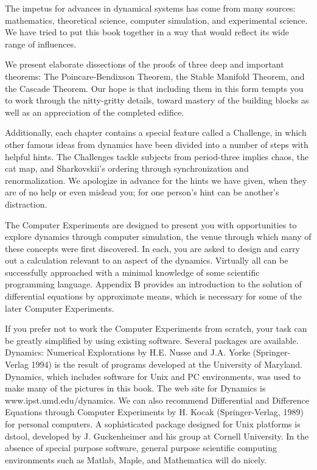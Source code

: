 \documentclass[12pt]{article}
\begin{document}
The impetus for advances in dynamical systems has come from many sources: mathematics, theoretical science, 
computer simulation, and experimental science. We have tried to put this book together in a way that would reflect its wide range of 
influences.

We present elaborate dissections of the proofs of three deep and important theorems: The 
Poincare-Bendixson Theorem, the Stable Manifold Theorem, and the Cascade Theorem. Our hope is that 
including them in this form tempts you to work through the nitty-gritty details, toward mastery of the 
building blocks as well as an appreciation of the completed edifice.

Additionally, each chapter contains a special feature called a Challenge, in which other famous ideas from 
dynamics have been divided into a number of steps with helpful hints. The Challenges tackle subjects from 
period-three implies chaos, the cat map, and Sharkovskii’s ordering through synchronization and 
renormalization. We apologize in advance for the hints we have given, when they are of no help or even 
mislead you; for one person’s hint can be another’s distraction.

The Computer Experiments are designed to present you with opportunities to explore dynamics through 
computer simulation, the venue through which many of these concepts were first discovered. In each, you are 
asked to design and carry out a calculation relevant to an aspect of the dynamics. Virtually all can be 
successfully approached with a minimal knowledge of some scientific programming language. Appendix B 
provides an introduction to the solution of differential equations by approximate means, which is necessary 
for some of the later Computer Experiments.

If you prefer not to work the Computer Experiments from scratch, your task can be greatly simplified by 
using existing software. Several packages are available. Dynamics: Numerical Explorations by H.E. Nusse and 
J.A. Yorke (Springer-Verlag 1994) is the result of programs developed at the University of Maryland. 
Dynamics, which includes software for Unix and PC environments, was used to make many of the pictures in 
this book. The web site for Dynamics is www.ipst.umd.edu/dynamics. We can also recommend Differential and 
Difference Equations through Computer Experiments by H. Kocak (Springer-Verlag, 1989) for personal 
computers. A sophisticated package designed for Unix platforms is dstool, developed by J. Guckenheimer and 
his group at Cornell University. In the absence of special purpose software, general purpose scientific 
computing environments such as Matlab, Maple, and Mathematica will do nicely.
\end{document}
